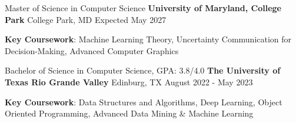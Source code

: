 
\begin{cventries}
  \cventry
    {Master of Science in Computer Science} %
    {\textbf{University of Maryland, College Park}} %
    {College Park, MD} %
    {Expected May 2027} %
    {
      \begin{cvitems} %
         \item {\textbf{Key Coursework}: Machine Learning Theory, Uncertainty Communication for Decision-Making, Advanced Computer Graphics}
      \end{cvitems}
      \dotfill
    }

  \cventry
    {Bachelor of Science in Computer Science, GPA: 3.8/4.0} %
    {\textbf{The University of Texas Rio Grande Valley}} %
    {Edinburg, TX} %
    {August 2022 - May 2023} %
    {
      \begin{cvitems} %
         \item {\textbf{Key Coursework}: Data Structures and Algorithms, Deep Learning, Object Oriented Programming, Advanced Data Mining \& Machine Learning}
      \end{cvitems}
    }

\end{cventries}
